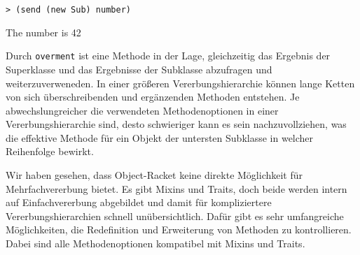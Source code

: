 \begin{lstlisting}
> (send (new Sub) number)
\end{lstlisting}
{\routput The number is 42}

Durch \texttt{overment} ist eine Methode in der Lage, gleichzeitig das Ergebnis der Superklasse und das Ergebnisse der Subklasse abzufragen und weiterzuverweneden. In einer größeren Vererbungshierarchie können  lange Ketten von sich überschreibenden und ergänzenden Methoden entstehen. Je abwechslungreicher die verwendeten Methodenoptionen in einer Vererbungshierarchie sind, desto schwieriger kann es sein nachzuvollziehen, was die effektive Methode für ein Objekt der untersten Subklasse in welcher Reihenfolge bewirkt.

Wir haben gesehen, dass Object-Racket keine direkte Möglichkeit für Mehrfachvererbung bietet. Es gibt Mixins und Traits, doch beide werden intern auf Einfachvererbung abgebildet und damit für kompliziertere Vererbungshierarchien schnell unübersichtlich. Dafür gibt es sehr umfangreiche Möglichkeiten, die Redefinition und Erweiterung von Methoden zu kontrollieren. Dabei sind alle  Methodenoptionen kompatibel mit Mixins und Traits. 

